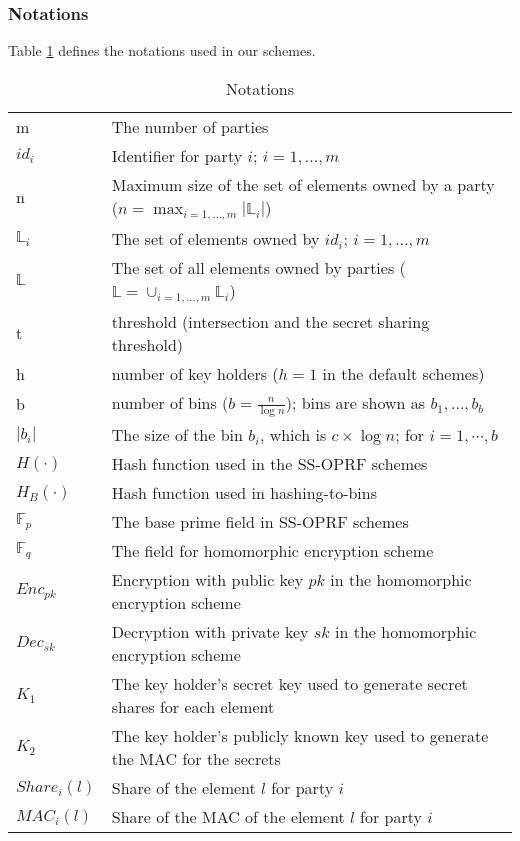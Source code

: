 \subsubsection{Notations} 
Table \ref{tab:Notations} defines the notations used in our schemes. 
\begin{table}[h!]
  \centering
  \caption{Notations}
  \label{tab:Notations}
  \begin{tabular}{ll}
    \toprule
     &  \\
    \midrule
    m & The number of parties \\
    $id_i$ &  Identifier for party $i$; $i = 1, \dots, m$\\
    n &  Maximum size of the set of elements owned by a party ($n = \max_{i = 1, \dots, m}{|\mathbb{L}_i|}$)\\
    $\mathbb{L}_i$ & The set of elements owned by $id_i$; $i = 1, \dots, m$\\
    $\mathbb{L}$ & The set of all elements owned by parties ($\mathbb{L} = \cup_{i = 1, \dots, m}{\mathbb{L}_i}$)\\
    t &  threshold (intersection and the secret sharing threshold)\\
    h & number of key holders ($h=1$ in the default schemes)\\
    b &  number of bins ($b = \frac{n}{\log{n}}$); bins are shown as $b_1, \dots, b_b$\\
    $|b_i|$ & The size of the bin $b_i$, which is $c \times \log{n}$; for $i=1, \cdots, b$\\
    $H(\cdot)$ & Hash function used in the SS-OPRF schemes\\
    $H_B(\cdot)$ & Hash function used in hashing-to-bins\\
    $\mathbb{F}_p$ & The base prime field in SS-OPRF schemes\\
    $\mathbb{F}_q$ & The field for homomorphic encryption scheme\\
    $Enc_{pk}$ &  Encryption with public key $pk$ in the homomorphic encryption scheme\\
    $Dec_{sk}$ &  Decryption with private key $sk$ in the homomorphic encryption scheme\\   
    $K_1$ & The key holder's secret key used to generate secret shares for each element\\
    $K_2$ & The key holder's publicly known key used to generate the MAC for the secrets \\
    $Share_i(l)$ & Share of the element $l$ for party $i$\\
    $MAC_i(l)$ & Share of the MAC of the element $l$ for party $i$\\
    \bottomrule
  \end{tabular}
\end{table}

